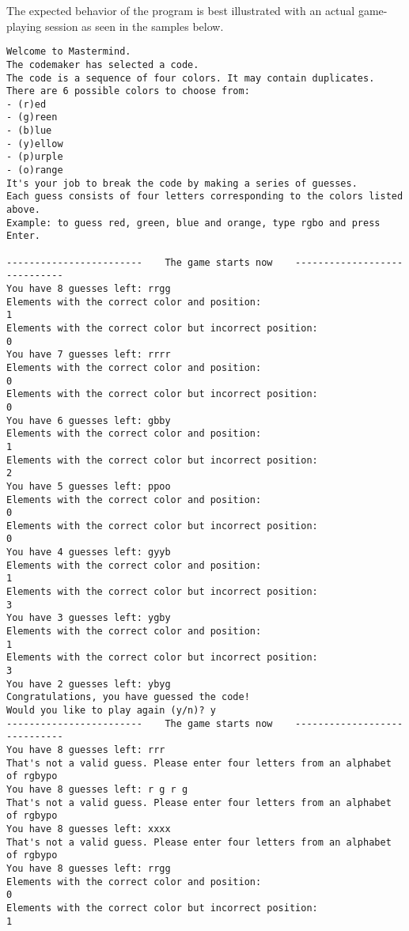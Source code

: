 The expected behavior of the program is best illustrated with an actual game-playing session as seen in the samples below.
\begin{verbatim}
Welcome to Mastermind.
The codemaker has selected a code.
The code is a sequence of four colors. It may contain duplicates.
There are 6 possible colors to choose from:
- (r)ed
- (g)reen
- (b)lue
- (y)ellow
- (p)urple
- (o)range
It's your job to break the code by making a series of guesses.
Each guess consists of four letters corresponding to the colors listed above.
Example: to guess red, green, blue and orange, type rgbo and press Enter.

------------------------    The game starts now    -----------------------------
You have 8 guesses left: rrgg
Elements with the correct color and position:                                  1
Elements with the correct color but incorrect position:                        0
You have 7 guesses left: rrrr
Elements with the correct color and position:                                  0
Elements with the correct color but incorrect position:                        0
You have 6 guesses left: gbby
Elements with the correct color and position:                                  1
Elements with the correct color but incorrect position:                        2
You have 5 guesses left: ppoo
Elements with the correct color and position:                                  0
Elements with the correct color but incorrect position:                        0
You have 4 guesses left: gyyb
Elements with the correct color and position:                                  1
Elements with the correct color but incorrect position:                        3
You have 3 guesses left: ygby
Elements with the correct color and position:                                  1
Elements with the correct color but incorrect position:                        3
You have 2 guesses left: ybyg
Congratulations, you have guessed the code!
Would you like to play again (y/n)? y
------------------------    The game starts now    -----------------------------
You have 8 guesses left: rrr
That's not a valid guess. Please enter four letters from an alphabet of rgbypo
You have 8 guesses left: r g r g
That's not a valid guess. Please enter four letters from an alphabet of rgbypo
You have 8 guesses left: xxxx
That's not a valid guess. Please enter four letters from an alphabet of rgbypo
You have 8 guesses left: rrgg
Elements with the correct color and position:                                  0
Elements with the correct color but incorrect position:                        1

\end{verbatim}
